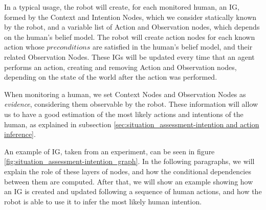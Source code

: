 In a typical usage, the robot will create, for each monitored human, an IG, formed by the Context and Intention Nodes, which we consider statically known by the robot, and a variable list of Action and Observation nodes, which depends on the human's belief model. The robot will create action nodes for each known action whose $preconditions$ are satisfied in the human's belief model, and their related Observation Nodes. These IGs will be updated every time that an agent performs an action, creating and removing Action and Observation nodes, depending on the state of the world after the action was performed.

When monitoring a human, we set Context Nodes and Observation Nodes as \textit{evidence}, considering them observable by the robot. These information will allow us to have a good estimation of the most likely actions and intentions of the human, as explained in subsection \ref{sec:situation_assessment-intention and action inference}. 


An example of IG, taken from an experiment, can be seen in figure \ref{fig:situation_assessment-intention_graph}. In the following paragraphs, we will explain the role of these layers of nodes, and how the conditional dependencies between them are computed. After that, we will show an example showing how an IG is created and updated following a sequence of human actions, and how the robot is able to use it to infer the most likely human intention.

